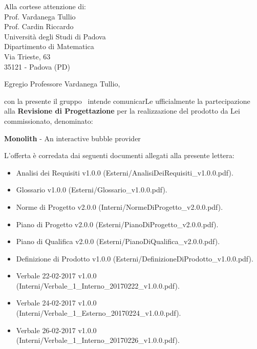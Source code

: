 

\newcommand{\logo}{../../Template/Logo/Logo.png}
\newcommand{\data}{\today}
\newcommand{\oggetto}{Presentazione della proposta di partecipazione alla Revisione di progetto.}
\newcommand{\mittente}{Francesco Bazzerla \\ Responsabile NPE Developers}
\newcommand{\firma}{../../Template/Firme/FB.png}





\begin{letter}{Alla cortese attenzione di:  \\
 Prof. Vardanega Tullio \\
 Prof. Cardin Riccardo \\
 Università degli Studi di Padova \\
 Dipartimento di Matematica \\
 Via Trieste, 63 \\
 35121 - Padova (PD)}

\opening{Egregio Professore Vardanega Tullio,} 

con la presente il gruppo \gruppo\ intende comunicarLe ufficialmente la partecipazione alla \textbf{Revisione di Progettazione} per la realizzazione del prodotto da Lei commissionato, denominato:
\begin{center}
\textbf{Monolith} - An interactive bubble provider
\end{center}
L'offerta è corredata dai seguenti documenti allegati alla presente lettera:
\begin{itemize}
	\item  Analisi dei Requisiti v1.0.0 (Esterni/AnalisiDeiRequisiti\_v1.0.0.pdf).
	\item  Glossario v1.0.0 (Esterni/Glossario\_v1.0.0.pdf).
	\item  Norme di Progetto v2.0.0 (Interni/NormeDiProgetto\_v2.0.0.pdf).
	\item  Piano di Progetto v2.0.0 (Esterni/PianoDiProgetto\_v2.0.0.pdf).
	\item  Piano di Qualifica v2.0.0 (Esterni/PianoDiQualifica\_v2.0.0.pdf).
	\item Definizione di Prodotto v1.0.0 (Esterni/DefinizioneDiProdotto\_v1.0.0.pdf).
	\item  Verbale 22-02-2017 v1.0.0 (Interni/Verbale\_1\_Interno\_20170222\_v1.0.0.pdf).
		\item  Verbale 24-02-2017 v1.0.0 (Interni/Verbale\_1\_Esterno\_20170224\_v1.0.0.pdf).
			\item  Verbale 26-02-2017 v1.0.0 (Interni/Verbale\_1\_Interno\_20170226\_v1.0.0.pdf).
\end{itemize}


\end{letter}
